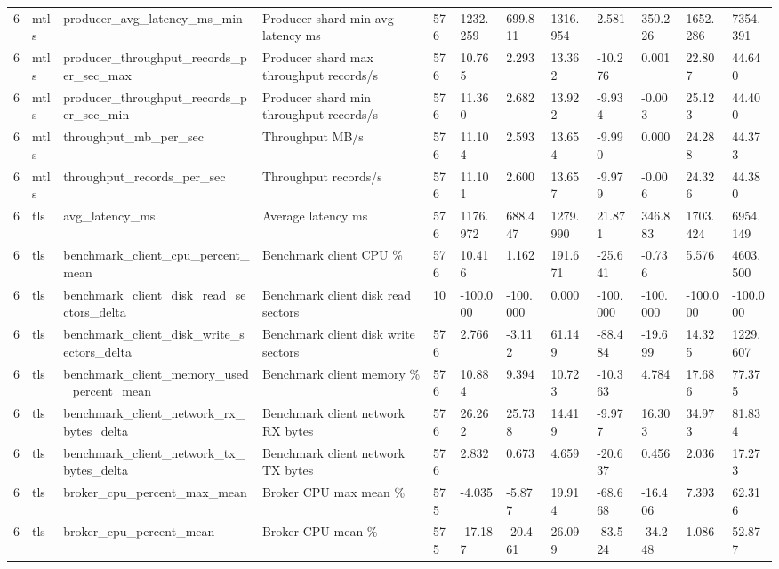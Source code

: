 \begin{longtable}{llllllllllll}
6 & mtls & producer\_avg\_latency\_ms\_min & Producer shard min avg latency ms & 576 & 1232.259 & 699.811 & 1316.954 & 2.581 & 350.226 & 1652.286 & 7354.391 \\
6 & mtls & producer\_throughput\_records\_per\_sec\_max & Producer shard max throughput records/s & 576 & 10.765 & 2.293 & 13.362 & -10.276 & 0.001 & 22.807 & 44.640 \\
6 & mtls & producer\_throughput\_records\_per\_sec\_min & Producer shard min throughput records/s & 576 & 11.360 & 2.682 & 13.922 & -9.934 & -0.003 & 25.123 & 44.400 \\
6 & mtls & throughput\_mb\_per\_sec & Throughput MB/s & 576 & 11.104 & 2.593 & 13.654 & -9.990 & 0.000 & 24.288 & 44.373 \\
6 & mtls & throughput\_records\_per\_sec & Throughput records/s & 576 & 11.101 & 2.600 & 13.657 & -9.979 & -0.006 & 24.326 & 44.380 \\
6 & tls & avg\_latency\_ms & Average latency ms & 576 & 1176.972 & 688.447 & 1279.990 & 21.871 & 346.883 & 1703.424 & 6954.149 \\
6 & tls & benchmark\_client\_cpu\_percent\_mean & Benchmark client CPU \% & 576 & 10.416 & 1.162 & 191.671 & -25.641 & -0.736 & 5.576 & 4603.500 \\
6 & tls & benchmark\_client\_disk\_read\_sectors\_delta & Benchmark client disk read sectors & 10 & -100.000 & -100.000 & 0.000 & -100.000 & -100.000 & -100.000 & -100.000 \\
6 & tls & benchmark\_client\_disk\_write\_sectors\_delta & Benchmark client disk write sectors & 576 & 2.766 & -3.112 & 61.149 & -88.484 & -19.699 & 14.325 & 1229.607 \\
6 & tls & benchmark\_client\_memory\_used\_percent\_mean & Benchmark client memory \% & 576 & 10.884 & 9.394 & 10.723 & -10.363 & 4.784 & 17.686 & 77.375 \\
6 & tls & benchmark\_client\_network\_rx\_bytes\_delta & Benchmark client network RX bytes & 576 & 26.262 & 25.738 & 14.419 & -9.977 & 16.303 & 34.973 & 81.834 \\
6 & tls & benchmark\_client\_network\_tx\_bytes\_delta & Benchmark client network TX bytes & 576 & 2.832 & 0.673 & 4.659 & -20.637 & 0.456 & 2.036 & 17.273 \\
6 & tls & broker\_cpu\_percent\_max\_mean & Broker CPU max mean \% & 575 & -4.035 & -5.877 & 19.914 & -68.668 & -16.406 & 7.393 & 62.316 \\
6 & tls & broker\_cpu\_percent\_mean & Broker CPU mean \% & 575 & -17.187 & -20.461 & 26.099 & -83.524 & -34.248 & 1.086 & 52.877 \\

\end{longtable}
